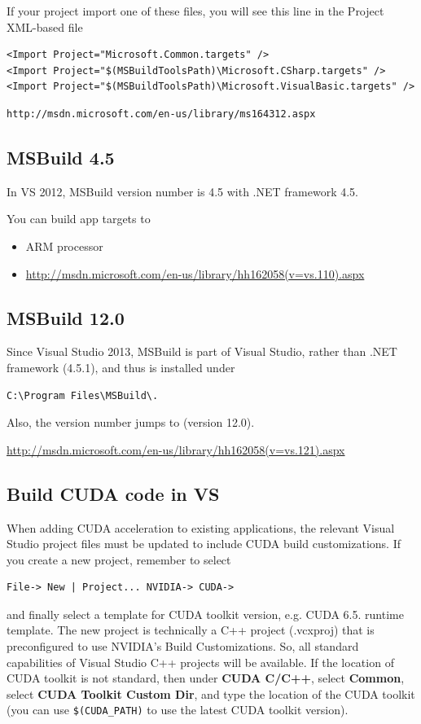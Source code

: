 If your project import one of these files, you will see this line in the Project
XML-based file
\begin{verbatim}
<Import Project="Microsoft.Common.targets" />
<Import Project="$(MSBuildToolsPath)\Microsoft.CSharp.targets" />
<Import Project="$(MSBuildToolsPath)\Microsoft.VisualBasic.targets" />
\end{verbatim}



\begin{verbatim}
http://msdn.microsoft.com/en-us/library/ms164312.aspx
\end{verbatim}

\subsection{MSBuild 4.5}

In VS 2012, MSBuild version number is 4.5 with .NET framework 4.5. 

You can build app targets to 
\begin{itemize}
  \item ARM processor
  \item
  \url{http://msdn.microsoft.com/en-us/library/hh162058(v=vs.110).aspx}
\end{itemize}


\subsection{MSBuild 12.0}

Since Visual Studio 2013, MSBuild is part of Visual Studio,
rather than .NET framework (4.5.1), and thus is installed under
\begin{verbatim}
C:\Program Files\MSBuild\.
\end{verbatim}
Also, the version number jumps to (version 12.0).


\url{http://msdn.microsoft.com/en-us/library/hh162058(v=vs.121).aspx}



\subsection{Build CUDA code in VS}

When adding CUDA acceleration to existing applications, the relevant Visual
Studio project files must be updated to include CUDA build customizations.
If you create a new project, remember to select
\begin{verbatim}
File-> New | Project... NVIDIA-> CUDA->
\end{verbatim}
and finally select a template for CUDA toolkit version, e.g. CUDA 6.5. runtime
template.  The new project is technically a C++ project (.vcxproj) that is
preconfigured to use NVIDIA's Build Customizations. 
So, all standard capabilities of Visual Studio C++ projects will be available.
If the location of CUDA toolkit is not standard, then under {\bf CUDA C/C++},
select {\bf Common}, select {\bf CUDA Toolkit Custom Dir}, and type the location
of the CUDA toolkit (you can use \verb!$(CUDA_PATH)! to use the latest
CUDA toolkit version).

